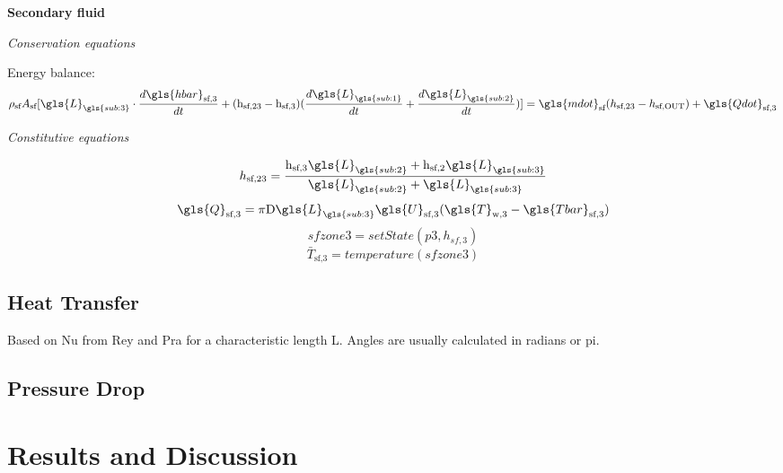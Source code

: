 \documentclass[11pt]{article} %
\begin{document}
{\bf Secondary fluid}
\begin{center}
\textit{Conservation equations}
\end{center}
Energy balance:\\
\begin{equation}
\rho_\text{sf} A_\text{sf} [\gls{L}_{\gls{sub:3}} \cdot  \frac{d \gls{hbar}_\text{sf,3}}{d t} +  (\text{h}_\text{sf,23} - \text{h}_\text{sf,3}) ( \frac{d \gls{L}_{\gls{sub:1}}}{d t} + \frac{d \gls{L}_{\gls{sub:2}}}{d t})] = \gls{mdot}_\text{sf} ({h}_\text{sf,23} - h_\text{sf,OUT} ) + \gls{Qdot}_\text{sf,3} 
\end{equation}
\begin{center}
\textit{Constitutive equations}
\end{center}

\begin{equation}
h_\text{sf,23} = \frac{   \text{h}_\text{sf,3} \gls{L}_{\gls{sub:2}}  + \text{h}_\text{sf,2}\gls{L}_{\gls{sub:3}}      }{  \gls{L}_{\gls{sub:2}} + \gls{L}_{\gls{sub:3}}         } 
\end{equation}
\begin{equation}
\gls{Q}_\text{sf,3} = \pi \text{D} \gls{L}_{\gls{sub:3}} \gls{U}_\text{sf,3} (\gls{T}_\text{w,3} - \gls{Tbar}_\text{sf,3})
\end{equation}
\begin{equation}
sfzone3 = setState(p3,h_{sf,3})
\end{equation}
\begin{equation}
\bar{T}_\text{sf,3} = temperature(sfzone3)
\end{equation}
\subsection{Heat Transfer}

Based on \gls{Nu} from \gls{Rey} and \gls{Pra} for a characteristic length \gls{L}. Angles are usually calculated in radians or \gls{pi}.

\subsection{Pressure Drop}

\section{Results and Discussion}
\end{document}
